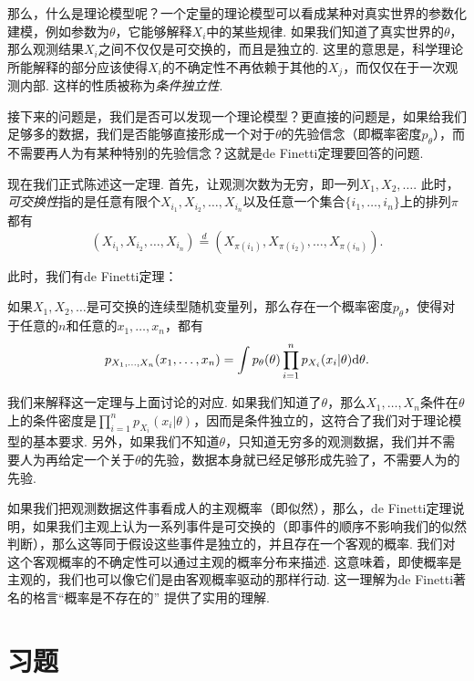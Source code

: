 那么，什么是理论模型呢？一个定量的理论模型可以看成某种对真实世界的参数化建模，例如参数为$\theta$，它能够解释$X_i$中的某些规律. 如果我们知道了真实世界的$\theta$，那么观测结果$X_i$之间不仅仅是可交换的，而且是独立的. 这里的意思是，科学理论所能解释的部分应该使得$X_i$的不确定性不再依赖于其他的$X_j$，而仅仅在于一次观测内部. 这样的性质被称为\textit{条件独立性}. 

接下来的问题是，我们是否可以发现一个理论模型？更直接的问题是，如果给我们足够多的数据，我们是否能够直接形成一个对于$\theta$的先验信念（即概率密度$p_\theta$），而不需要再人为有某种特别的先验信念？这就是de Finetti定理要回答的问题.

现在我们正式陈述这一定理. 首先，让观测次数为无穷，即一列$X_1,X_2,\dots$. 此时，\textit{可交换性}指的是任意有限个$X_{i_1},X_{i_2},\dots,X_{i_n}$以及任意一个集合$\{i_1,\dots,i_n\}$上的排列$\pi$都有
\[
    (X_{i_1},X_{i_2},\dots,X_{i_n})\stackrel{d}{=}(X_{\pi(i_1)},X_{\pi(i_2)},\dots,X_{\pi(i_n)}).
\]

此时，我们有de Finetti定理：

\begin{theorem}[de Finetti定理]
    如果$X_1,X_2,\dots$是可交换的连续型随机变量列，那么存在一个概率密度$p_\theta$，使得对于任意的$n$和任意的$x_1,\dots,x_n$，都有
    \[
        p_{X_1,\dots,X_n}(x_1,\dots,x_n) = \int p_\theta(\theta)\prod_{i=1}^n p_{X_i}(x_i|\theta)\mathrm{d}\theta.
    \]
\end{theorem}

我们来解释这一定理与上面讨论的对应. 如果我们知道了$\theta$，那么$X_1,\dots,X_n$条件在$\theta$上的条件密度是$\prod_{i=1}^n p_{X_i}(x_i|\theta)$，因而是条件独立的，这符合了我们对于理论模型的基本要求. 另外，如果我们不知道$\theta$，只知道无穷多的观测数据，我们并不需要人为再给定一个关于$\theta$的先验，数据本身就已经足够形成先验了，不需要人为的先验. 

\begin{remark}
    如果我们把观测数据这件事看成人的主观概率（即似然），那么，de Finetti定理说明，如果我们主观上认为一系列事件是可交换的（即事件的顺序不影响我们的似然判断），那么这等同于假设这些事件是独立的，并且存在一个客观的概率. 我们对这个客观概率的不确定性可以通过主观的概率分布来描述. 这意味着，即使概率是主观的，我们也可以像它们是由客观概率驱动的那样行动. 这一理解为de Finetti著名的格言“概率是不存在的”\cite{spiegelhalterWhyProbabilityProbably2024} 提供了实用的理解.
\end{remark}

\section{习题}

